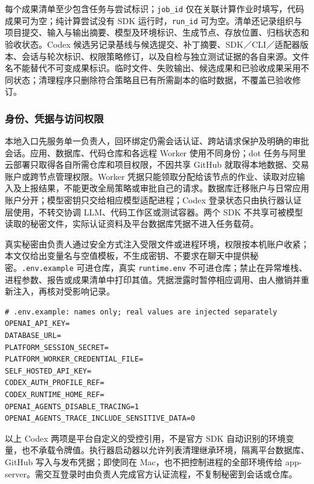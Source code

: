 \documentclass[11pt,a4paper]{article}
\begin{document}
每个成果清单至少包含任务与尝试标识；\texttt{job\_id} 仅在关联计算作业时填写，代码成果可为空；纯计算尝试没有 SDK 运行时，\texttt{run\_id} 可为空。清单还记录组织与项目提交、输入与输出摘要、模型及环境标识、生成节点、存放位置、归档状态和验收状态。Codex 候选另记录基线与候选提交、补丁摘要、SDK／CLI／适配器版本、会话与轮次标识、权限策略修订，以及自检与独立测试证据的各自来源。文件名不能替代不可变成果标识。临时文件、失败输出、候选成果和已验收成果采用不同状态；清理程序只删除符合策略且已有所需副本的临时数据，不覆盖已验收修订。

\subsubsection{身份、凭据与访问权限}

本地入口先服务单一负责人，回环绑定仍需会话认证、跨站请求保护及明确的审批会话。应用、数据库、代码仓库和各远程 Worker 使用不同身份；dot 任务与阿里云部署只取得各自所需仓库和项目权限，不因共享 GitHub 就取得本地数据、交易账户或跨节点管理权限。Worker 凭据只能领取分配给该节点的作业、读取对应输入及上报结果，不能更改全局策略或审批自己的请求。数据库迁移账户与日常应用账户分开；模型密钥只交给相应模型适配进程；Codex 登录状态只由执行器认证层使用，不转交协调 LLM、代码工作区或测试容器。两个 SDK 不共享可被模型读取的秘密文件，实际认证资料及平台数据库凭据不进入任务载荷。

真实秘密由负责人通过安全方式注入受限文件或进程环境，权限按本机账户收紧；本文仅给出变量名与空值模板，不生成密钥、不要求在聊天中提供秘密。\texttt{.env.example} 可进仓库，真实 \texttt{runtime.env} 不可进仓库；禁止在异常堆栈、进程参数、报告或成果清单中打印其值。凭据泄露时暂停相应调用、由人撤销并重新注入，再核对受影响记录。

\par\noindent\begin{minipage}{\linewidth}
\begin{lstlisting}
# .env.example: names only; real values are injected separately
OPENAI_API_KEY=
DATABASE_URL=
PLATFORM_SESSION_SECRET=
PLATFORM_WORKER_CREDENTIAL_FILE=
SELF_HOSTED_API_KEY=
CODEX_AUTH_PROFILE_REF=
CODEX_RUNTIME_HOME_REF=
OPENAI_AGENTS_DISABLE_TRACING=1
OPENAI_AGENTS_TRACE_INCLUDE_SENSITIVE_DATA=0
\end{lstlisting}
\end{minipage}\par


以上 Codex 两项是平台自定义的受控引用，不是官方 SDK 自动识别的环境变量，也不承载令牌值。执行器启动器以允许列表清理继承环境，隔离平台数据库、GitHub 写入与发布凭据；即使同在 Mac，也不把控制进程的全部环境传给 app-server。需交互登录时由负责人完成官方认证流程，不复制秘密到会话或仓库。
\end{document}
